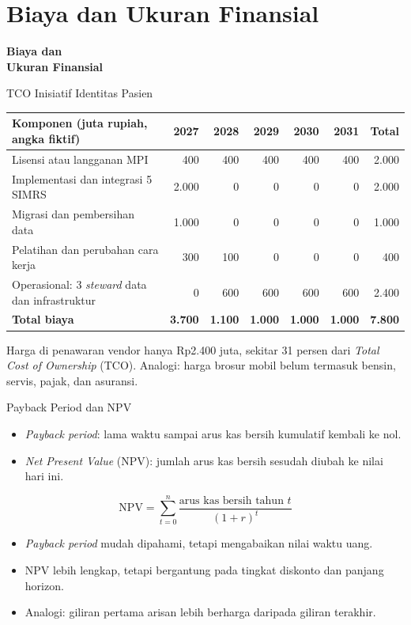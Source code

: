 \documentclass[aspectratio=169, table, 12pt]{beamer}
\begin{document}
\section{Biaya dan Ukuran Finansial}

\begin{frame}{\hfill}
  \centering
  \Huge{\textbf{Biaya dan\\Ukuran Finansial}}
\end{frame}

\begin{frame}{{\Large TCO Inisiatif Identitas Pasien}}
  \scriptsize
  \begin{tabularx}{\textwidth}{Yrrrrrr}
    \hline
    \textbf{Komponen (juta rupiah, angka fiktif)} & \textbf{2027} & \textbf{2028} & \textbf{2029} &
      \textbf{2030} & \textbf{2031} & \textbf{Total} \\
    \hline
    Lisensi atau langganan MPI & 400 & 400 & 400 & 400 & 400 & 2.000 \\
    \hline
    Implementasi dan integrasi 5 SIMRS & 2.000 & 0 & 0 & 0 & 0 & 2.000 \\
    \hline
    Migrasi dan pembersihan data & 1.000 & 0 & 0 & 0 & 0 & 1.000 \\
    \hline
    Pelatihan dan perubahan cara kerja & 300 & 100 & 0 & 0 & 0 & 400 \\
    \hline
    Operasional: 3 \textit{steward} data dan infrastruktur & 0 & 600 & 600 & 600 & 600 & 2.400 \\
    \hline
    \textbf{Total biaya} & \textbf{3.700} & \textbf{1.100} & \textbf{1.000} &
      \textbf{1.000} & \textbf{1.000} & \textbf{7.800} \\
    \hline
  \end{tabularx}

  \vspace{6pt}
  \small Harga di penawaran vendor hanya Rp2.400 juta, sekitar 31 persen dari \textit{Total Cost of
  Ownership} (TCO). Analogi: harga brosur mobil belum termasuk bensin, servis, pajak, dan asuransi.
\end{frame}

\begin{frame}{{\Large Payback Period dan NPV}}
  \small
  \vspace{2pt}
  \begin{itemize}
    \item \textit{Payback period}: lama waktu sampai arus kas bersih kumulatif kembali ke nol.
    \item \textit{Net Present Value} (NPV): jumlah arus kas bersih sesudah diubah ke nilai hari ini.
  \end{itemize}
  \[
    \mathrm{NPV} = \sum_{t=0}^{n} \frac{\text{arus kas bersih tahun } t}{(1+r)^{t}}
  \]
  \begin{itemize}
    \item \textit{Payback period} mudah dipahami, tetapi mengabaikan nilai waktu uang.
    \item NPV lebih lengkap, tetapi bergantung pada tingkat diskonto dan panjang horizon.
    \item Analogi: giliran pertama arisan lebih berharga daripada giliran terakhir.
  \end{itemize}
\end{frame}
\end{document}
